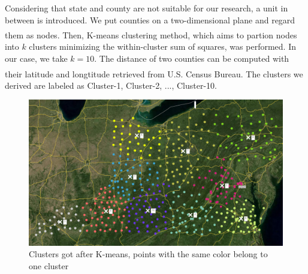 \documentclass[12pt]{article}
\newcommand{\upcite}[1]{\textsuperscript{\textsuperscript{\cite{#1}}}}
\begin{document}
Considering that state and county are not suitable for our research, a unit in between is introduced. We put counties on a two-dimensional plane and regard them as nodes. Then, K-means clustering method\upcite{1}, which aims to partion nodes into $k$ clusters minimizing the within-cluster sum of squares, was performed. In our case, we take $k = 10$. The distance of two counties can be computed with their latitude and longtitude retrieved from U.S. Census Bureau\upcite{2}. The clusters we derived are labeled as Cluster-1, Cluster-2, ..., Cluster-10.
\begin{figure}[H]
	\centering
	\includegraphics[scale=0.3]{./figures/0.png}
	\caption{Clusters got after K-means, points with the same color belong to one cluster}
	\label{Fig0}
\end{figure}
\end{document}
